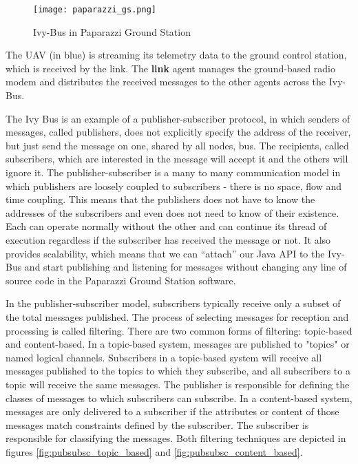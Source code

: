     \begin{figure}[h!]
     \begin{center}
      \texttt{[image: paparazzi\_gs.png]}
     \end{center}
      \caption{Ivy-Bus in Paparazzi Ground Station\label{fig:paparazziGS}}
    \end{figure}
    
    The UAV (in blue) is streaming its telemetry data to the ground control station, which is received by the link. The \textbf{link} agent manages the ground-based radio modem and distributes the received messages to the other agents across the Ivy-Bus.
    
    The Ivy Bus is an example of a publisher-subscriber protocol, in which senders of messages, called publishers, does not  explicitly specify the address of the receiver, but just send the message on one, shared by all nodes, bus. The recipients, called subscribers, which are interested in the message will accept it and the others will ignore it. The publisher-subscriber is a many to many communication model in which publishers are loosely coupled to subscribers - there is no space, flow and time coupling. This means that the publishers does not have to know the addresses of the subscribers and even does not need to know of their existence. Each can operate normally without the other and can continue its thread of execution regardless if the subscriber has received the message or not. It also provides scalability, which means that we can “attach” our Java API to the Ivy-Bus and start publishing and listening for messages without changing any line of source code in the Paparazzi Ground Station software.
    
    In the publisher-subscriber model, subscribers typically receive only a subset of the total messages published. The process of selecting messages for reception and processing is called filtering. There are two common forms of filtering: topic-based and content-based.
    In a topic-based system, messages are published to "topics" or named logical channels. Subscribers in a topic-based system will receive all messages published to the topics to which they subscribe, and all subscribers to a topic will receive the same messages. The publisher is responsible for defining the classes of messages to which subscribers can subscribe.
    In a content-based system, messages are only delivered to a subscriber if the attributes or content of those messages match constraints defined by the subscriber. The subscriber is responsible for classifying the messages. Both filtering techniques are depicted in figures \ref{fig:pubsubsc_topic_based} and \ref{fig:pubsubsc_content_based}.
    
